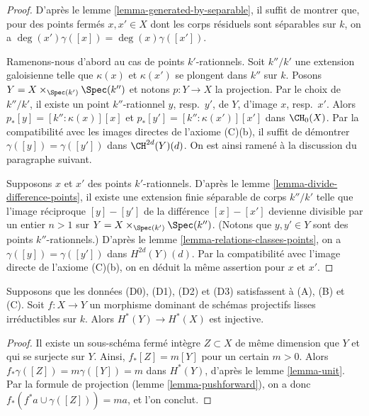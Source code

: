 \begin{proof}
D'après le lemme \ref{lemma-generated-by-separable}, il suffit de montrer que,
pour des points fermés $x, x' \in X$ dont les corps résiduels sont séparables sur $k$,
on a $\deg(x') \gamma([x]) = \deg(x) \gamma([x'])$.

\medskip\noindent
Ramenons-nous d'abord au cas de points $k'$-rationnels. Soit $k''/k'$ une
extension galoisienne telle que $\kappa(x)$ et $\kappa(x')$ se plongent dans $k''$
sur $k$. Posons $Y = X \times_{\Spec(k')} \Spec(k'')$ et notons $p : Y \to X$
la projection. Par le choix de $k''/k'$, il existe un
point $k''$-rationnel $y$, resp.\ $y'$, de $Y$, d'image $x$, resp.\ $x'$.
Alors $p_*[y] = [k'' : \kappa(x)][x]$ et
$p_*[y'] = [k'' : \kappa(x')][x']$ dans $\CH_0(X)$.
Par la compatibilité avec les images directes de l'axiome (C)(b),
il suffit de démontrer $\gamma([y]) = \gamma([y'])$ dans $\CH^{2d}(Y)(d)$.
On est ainsi ramené à la discussion du paragraphe suivant.

\medskip\noindent
Supposons $x$ et $x'$ des points $k'$-rationnels. D'après
le lemme \ref{lemma-divide-difference-points},
il existe une extension finie séparable de corps $k''/k'$
telle que l'image réciproque $[y] - [y']$
de la différence $[x] - [x']$ devienne divisible
par un entier $n > 1$ sur $Y = X \times_{\Spec(k')} \Spec(k'')$.
(Notons que $y, y' \in Y$ sont des points $k''$-rationnels.)
D'après le lemme \ref{lemma-relations-classes-points}, on a
$\gamma([y]) = \gamma([y'])$ dans $H^{2d}(Y)(d)$.
Par la compatibilité avec l'image directe de l'axiome (C)(b),
on en déduit la même assertion pour $x$ et $x'$.
\end{proof}

\begin{lemma}
\label{lemma-injective}
Supposons que les données (D0), (D1), (D2) et (D3) satisfassent à (A), (B) et (C). Soit
$f : X \to Y$ un morphisme dominant de schémas projectifs lisses irréductibles
sur $k$. Alors $H^*(Y) \to H^*(X)$ est injective.
\end{lemma}

\begin{proof}
Il existe un sous-schéma fermé intègre $Z \subset X$ de même
dimension que $Y$ et qui se surjecte sur $Y$. Ainsi, $f_*[Z] = m[Y]$ pour un certain $m > 0$.
Alors $f_* \gamma([Z]) = m \gamma([Y]) = m$ dans $H^*(Y)$, d'après
le lemme \ref{lemma-unit}. Par la formule de projection
(lemme \ref{lemma-pushforward}),
on a donc $f_*(f^*a \cup \gamma([Z])) = m a$, et l'on conclut.
\end{proof}

